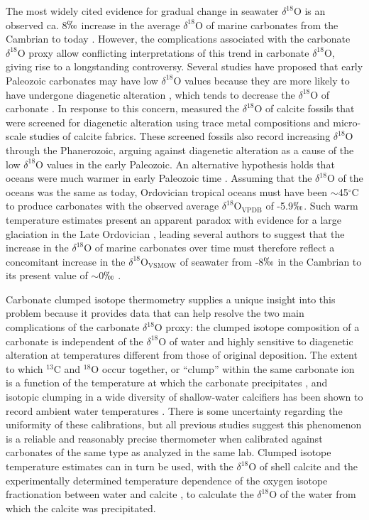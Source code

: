 \documentclass[preprint, authoryear]{elsarticle}
\begin{document}
The most widely cited evidence for gradual change in seawater $\delta^{18}$O is an observed ca. 8$\permil$ increase in the average $\delta^{18}$O of marine carbonates from the Cambrian to today \citep{Jaffres2007, Veizer1999}. However, the complications associated with the carbonate $\delta^{18}$O proxy allow conflicting interpretations of this trend in carbonate $\delta^{18}$O, giving rise to a longstanding controversy. Several studies have proposed that early Paleozoic carbonates may have low $\delta^{18}$O values because they are more likely to have undergone diagenetic alteration \citep{Clayton1959, Keith1964, Land1995}, which tends to decrease the $\delta^{18}$O of carbonate \citep{Marshall1992}. In response to this concern, \cite{Veizer1999} measured the $\delta^{18}$O of calcite fossils that were screened for diagenetic alteration using trace metal compositions and micro-scale studies of calcite fabrics. These screened fossils also record increasing $\delta^{18}$O through the Phanerozoic, arguing against diagenetic alteration as a cause of the low $\delta^{18}$O values in the early Paleozoic. An alternative hypothesis holds that oceans were much warmer in early Paleozoic time \citep{Karhu1986, Knauth1976}. Assuming that the $\delta^{18}$O of the oceans was the same as today, Ordovician tropical oceans must have been $\sim$45$^{\circ}$C to produce carbonates with the observed average $\delta^{18}$O$_{\text{VPDB}}$ of -5.9$\permil$. Such warm temperature estimates present an apparent paradox with evidence for a large glaciation in the Late Ordovician \citep{Veizer1986}, leading several authors to suggest that the increase in the $\delta^{18}$O of marine carbonates over time must therefore reflect a concomitant increase in the $\delta^{18}$O$_{\text{VSMOW}}$ of seawater from -8$\permil$ in the Cambrian to its present value of $\sim$0$\permil$ \citep{Jaffres2007, Veizer1999}. 

Carbonate clumped isotope thermometry supplies a unique insight into this problem because it provides data that can help resolve the two main complications of the carbonate $\delta^{18}$O proxy: the clumped isotope composition of a carbonate is independent of the $\delta^{18}$O of water and highly sensitive to diagenetic alteration at temperatures different from those of original deposition. The extent to which $^{13}$C and $^{18}$O occur together, or ``clump'' within the same carbonate ion is a function of the temperature at which the carbonate precipitates \citep{Eiler2011}, and isotopic clumping in a wide diversity of shallow-water calcifiers has been shown to record ambient water temperatures \citep{Ghosh2006, Henkes2013, Saenger2012, Tripati2010}. There is some uncertainty regarding the uniformity of these calibrations, but all previous studies suggest this phenomenon is a reliable and reasonably precise thermometer when calibrated against carbonates of the same type as analyzed in the same lab. Clumped isotope temperature estimates can in turn be used, with the $\delta^{18}$O of shell calcite and the experimentally determined temperature dependence of the oxygen isotope fractionation between water and calcite \citep{Kim1997}, to calculate the $\delta^{18}$O of the water from which the calcite was precipitated.
\end{document}
